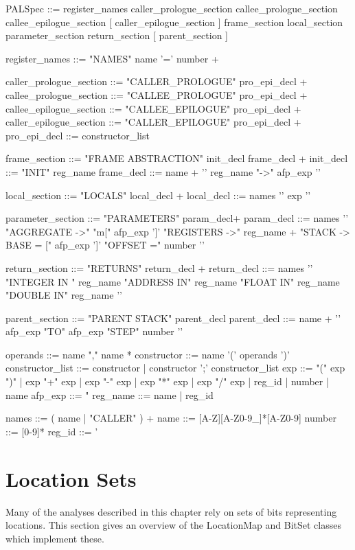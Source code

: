 \begin{fnverbatim}
PALSpec ::= register_names
      caller_prologue_section callee_prologue_section
      callee_epilogue_section [ caller_epilogue_section ]
      frame_section local_section parameter_section
      return_section [ parent_section ]

register_names ::= "NAMES" { name '=' number } +

caller_prologue_section ::=
      "CALLER_PROLOGUE" pro_epi_decl +
callee_prologue_section ::=
      "CALLEE_PROLOGUE" pro_epi_decl +
callee_epilogue_section ::=
      "CALLEE_EPILOGUE" pro_epi_decl +
caller_epilogue_section ::=
      "CALLER_EPILOGUE" pro_epi_decl +
pro_epi_decl ::= constructor_list

frame_section ::= "FRAME ABSTRACTION" init_decl
      frame_decl +
init_decl ::= "INIT" reg_name
frame_decl ::= name + '{' reg_name "->" afp_exp '}'

local_section ::= "LOCALS" local_decl +
local_decl ::= names '{' exp '}'

parameter_section ::= "PARAMETERS" param_decl+
param_decl ::= names
      '{' "AGGREGATE ->" "m[" afp_exp ']'
          "REGISTERS ->" reg_name +
          "STACK -> BASE = [" afp_exp ']'
                   "OFFSET =" number '}'

return_section ::= "RETURNS" return_decl +
return_decl ::= names
      '{' "INTEGER IN " reg_name
          "ADDRESS IN" reg_name
          "FLOAT IN" reg_name
          "DOUBLE IN" reg_name '}'

parent_section ::= "PARENT STACK" parent_decl
parent_decl ::= name + '{' afp_exp "TO" afp_exp
      "STEP" number '}'

operands ::= name { "," name } *
constructor ::= name { '(' operands ')' }
constructor_list ::= constructor
      | constructor ';' constructor_list
exp ::= "(" exp ")"
      | exp "+" exp | exp "-" exp
      | exp "*" exp | exp "/" exp
      | reg_id | number | name
afp_exp ::=
      "%
reg_name ::= name | reg_id

names  ::= ( name | "CALLER" ) +
name   ::= [A-Z][A-Z0-9_]*[A-Z0-9]
number ::= [0-9]*
reg_id ::= '%
\end{fnverbatim}


\section{Location Sets}

Many of the analyses described in this chapter rely on sets of bits representing
locations. This section gives an overview of the LocationMap and BitSet classes
which implement these.


